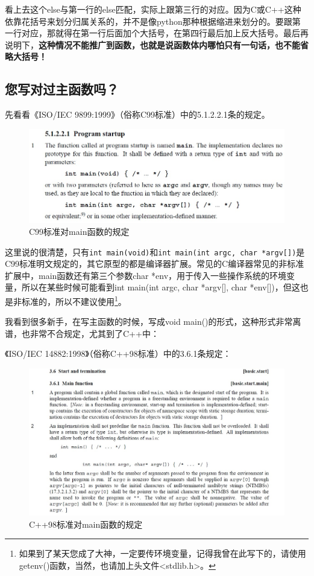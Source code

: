 \documentclass[11pt,twoside,a4paper,titlepage]{article}	%
\begin{document}
看上去这个else与第一行的else匹配，实际上跟第三行的对应。因为C或C++这种依靠花括号来划分归属关系的，并不是像python那种根据缩进来划分的。要跟第一行对应，那就得在第一行后面加个大括号，在第四行最后加上反大括号。最后再说明下，\textbf{这种情况不能推广到函数，也就是说函数体内哪怕只有一句话，也不能省略大括号！}

\subsection{您写对过主函数吗？}

先看看《ISO/IEC 9899:1999》（俗称C99标准）中的5.1.2.2.1条的规定。

\begin{figure}[bphtH]
\centering
\includegraphics[scale=.5]{../src/C99main.jpg}
\caption{C99标准对main函数的规定}
\label{fig:C99main}
\end{figure}

这里说的很清楚，只有\verb|int main(void)|和\verb|int main(int argc, char *argv[])|是C99标准明文规定的，其它原型的都是编译器扩展。常见的C编译器常见的非标准扩展中，main函数还有第三个参数char *env，用于传入一些操作系统的环境变量，所以在某些时候可能看到int main(int argc, char *argv[], char *env[])，但这也是非标准的，所以不建议使用\footnote{如果到了某天您成了大神，一定要传环境变量，记得我曾在此写下的，请使用getenv()函数，当然，也请加上头文件<stdlib.h>。}。

我看到很多新手，在写主函数的时候，写成void main()的形式，这种形式非常离谱，也非常不合规定，尤其到了C++中：

《ISO/IEC 14882:1998》（俗称C++98标准）中的3.6.1条规定：

\begin{figure}[H]
\centering
\includegraphics[scale=.5]{../src/cpp98main.jpg}
\caption{C++98标准对main函数的规定}
\label{fig:cpp98main}
\end{figure}
\end{document}
